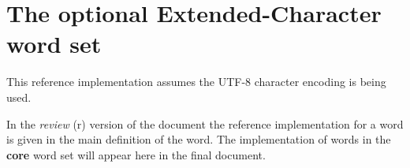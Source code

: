 \section{The optional Extended-Character word set} %
\label{imp:xchar}

This reference implementation assumes the UTF-8 character encoding
is being used.

\ifinline
	\begin{editor}
		In the \emph{review} (r) version of the document the
		reference implementation for a word is given in the main
		definition of the word.  The implementation of words
		in the \textbf{core} word set will appear here in the
		final document.
	\end{editor}
\else
	
\fi
